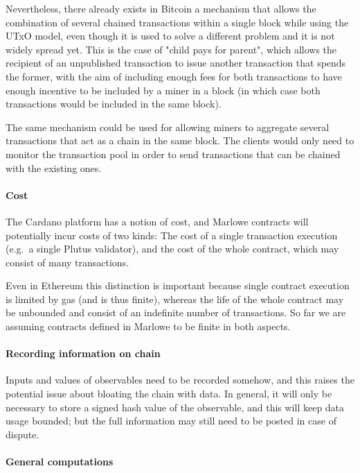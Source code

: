 \documentclass[runningheads]{llncs}
\begin{document}
Nevertheless, there already exists in Bitcoin a mechanism that allows the combination of several chained transactions within a single block while using the UTxO model, even though it is used to solve a different problem and it is not widely spread yet. This is the case of "child pays for parent", which allows the recipient of an unpublished transaction to issue another transaction that spends the former, with the aim of including enough fees for both transactions to have enough incentive to be included by a miner in a block (in which case both transactions would be included in the same block).

The same mechanism could be used for allowing miners to aggregate several transactions that act as a chain in the same block. The clients would only need to monitor the transaction pool in order to send transactions that can be chained with the existing ones.

\paragraph{Cost}

The Cardano platform has a notion of cost, and Marlowe contracts will potentially incur costs of two kinds: The cost of a single transaction execution (e.g.\ a single Plutus validator), and the cost of the whole contract, which may consist of many transactions.

Even in Ethereum this distinction is important because single contract execution is limited by gas (and is thus 
finite), whereas the life of the whole contract may be unbounded and consist of an indefinite number of transactions.  
So far we are assuming contracts defined in Marlowe to be finite in both aspects. 

\paragraph{Recording information on chain}

Inputs and values of observables need to be recorded somehow, and this raises the potential issue about bloating 
the chain with data. In general, it will only be necessary to store a signed hash value of the observable, and this will 
keep data usage bounded; but the full information may still need to be posted in case of dispute.


\paragraph{General computations}
\end{document}
